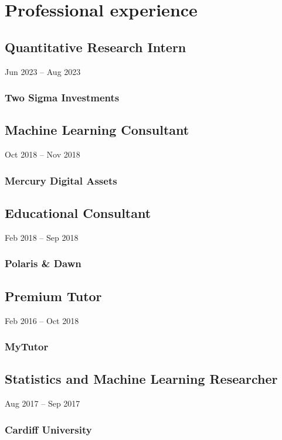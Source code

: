 \documentclass{wgu-cv}
\begin{document}
\section{Professional experience}

\subsection{Quantitative Research Intern}
{Jun 2023 -- Aug 2023}
\subsubsection{Two Sigma Investments}
\vspace{-0.20cm}

\subsection{Machine Learning Consultant}
{Oct 2018 -- Nov 2018}
\subsubsection{Mercury Digital Assets}
\vspace{-0.20cm}

\subsection{Educational Consultant}
{Feb 2018 -- Sep 2018}
\subsubsection{Polaris \& Dawn}
\vspace{-0.20cm}

\subsection{Premium Tutor}
{Feb 2016 -- Oct 2018}
\subsubsection{MyTutor}
\vspace{-0.20cm}

\subsection{Statistics and Machine Learning Researcher}
{Aug 2017 -- Sep 2017}
\subsubsection{Cardiff University}
\vspace{-0.20cm}
\end{document}
